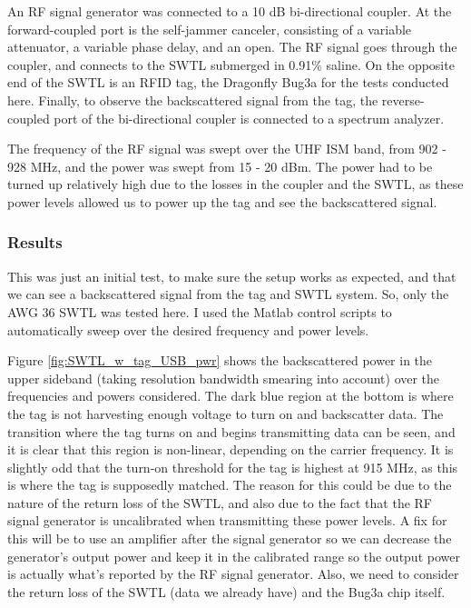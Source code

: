 \documentclass[12pt,onecolumn,titlepage]{article}
\begin{document}
An RF signal generator was connected to a 10 dB bi-directional coupler. At the forward-coupled port is the self-jammer canceler, consisting of a variable attenuator, a variable phase delay, and an open. The RF signal goes through the coupler, and connects to the SWTL submerged in 0.91\% saline. On the opposite end of the SWTL is an RFID tag, the Dragonfly Bug3a for the tests conducted here. Finally, to observe the backscattered signal from the tag, the reverse-coupled port of the bi-directional coupler is connected to a spectrum analyzer.

The frequency of the RF signal was swept over the UHF ISM band, from 902 - 928 MHz, and the power was swept from 15 - 20 dBm. The power had to be turned up relatively high due to the losses in the coupler and the SWTL, as these power levels allowed us to power up the tag and see the backscattered signal. 

\subsubsection{Results}
\indent \indent This was just an initial test, to make sure the setup works as expected, and that we can see a backscattered signal from the tag and SWTL system. So, only the AWG 36 SWTL was tested here. I used the Matlab control scripts to automatically sweep over the desired frequency and power levels. 

Figure \ref{fig:SWTL_w_tag_USB_pwr} shows the backscattered power in the upper sideband (taking resolution bandwidth smearing into account) over the frequencies and powers considered. The dark blue region at the bottom is where the tag is not harvesting enough voltage to turn on and backscatter data. The transition where the tag turns on and begins transmitting data can be seen, and it is clear that this region is non-linear, depending on the carrier frequency. It is slightly odd that the turn-on threshold for the tag is highest at 915 MHz, as this is where the tag is supposedly matched. The reason for this could be due to the nature of the return loss of the SWTL, and also due to the fact that the RF signal generator is uncalibrated when transmitting these power levels. A fix for this will be to use an amplifier after the signal generator so we can decrease the generator's output power and keep it in the calibrated range so the output power is actually what's reported by the RF signal generator. Also, we need to consider the return loss of the SWTL (data we already have) and the Bug3a chip itself.
\end{document}
